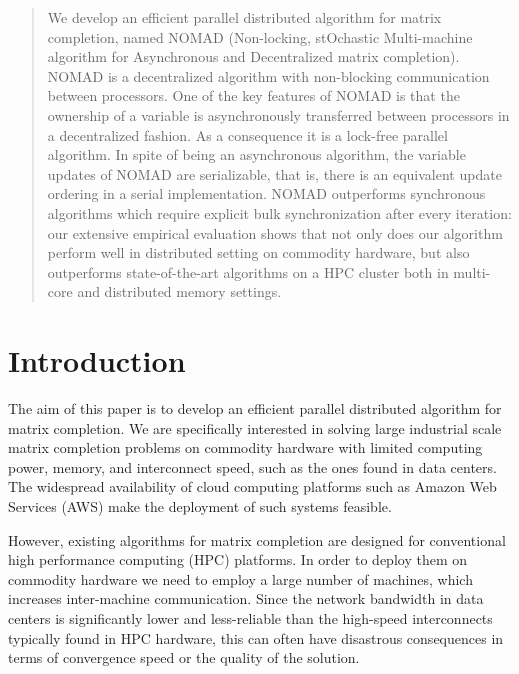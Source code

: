 \documentclass{vldb}
\begin{document}
\maketitle

\begin{abstract}
  We develop an efficient parallel distributed algorithm for matrix
  completion, named NOMAD (Non-locking, stOchastic Multi-machine
  algorithm for Asynchronous and Decentralized matrix completion).
  NOMAD is a decentralized algorithm with non-blocking communication
  between processors. One of the key features of NOMAD is that the
  ownership of a variable is asynchronously transferred between
  processors in a decentralized fashion. As a consequence it is a
  lock-free parallel algorithm. In spite of being an asynchronous
  algorithm, the variable updates of NOMAD are serializable, that is,
  there is an equivalent update ordering in a serial implementation.
  NOMAD outperforms synchronous algorithms which require explicit bulk
  synchronization after every iteration: our extensive empirical
  evaluation shows that not only does our algorithm perform well in
  distributed setting on commodity hardware, but also outperforms
  state-of-the-art algorithms on a HPC cluster both in multi-core and
  distributed memory settings.
\end{abstract}


\section{Introduction}
\label{sec:Introduction}



The aim of this paper is to develop an efficient parallel distributed
algorithm for matrix completion.  We are specifically interested in
solving large industrial scale matrix completion problems on commodity
hardware with limited computing power, memory, and interconnect speed,
such as the ones found in data centers. The widespread availability of
cloud computing platforms such as Amazon Web Services (AWS) make the
deployment of such systems feasible.

However, existing algorithms for matrix completion are designed for
conventional high performance computing (HPC) platforms. In order to
deploy them on commodity hardware we need to employ a large number of
machines, which increases inter-machine communication. Since the network
bandwidth in data centers is significantly lower and less-reliable than
the high-speed interconnects typically found in HPC hardware, this can
often have disastrous consequences in terms of convergence speed or the
quality of the solution. 
\end{document}
